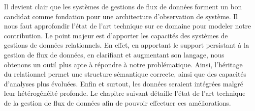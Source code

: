 Il devient clair que les systèmes de gestions de flux de données forment un bon candidat comme fondation pour une architecture d'observation de système. Il nous faut approfondir l'état de l'art technique sur ce domaine pour modeler notre contribution. Le point majeur est d'apporter les capacités des systèmes de gestions de données relationnels. En effet, en apportant le support persistant à la gestion de flux de données, en clarifiant et augmentant son langage, nous obtenons un outil plus apte à répondre à notre problématique. Ainsi, l'héritage du relationnel permet une structure sémantique correcte, ainsi que des capacités d'analyses plus évoluées. Enfin et surtout, les données seraient intégrées malgré leur hétérogénéité profonde. Le chapitre suivant détaille l'état de l'art technique de la gestion de flux de données afin de pouvoir effectuer ces améliorations.

